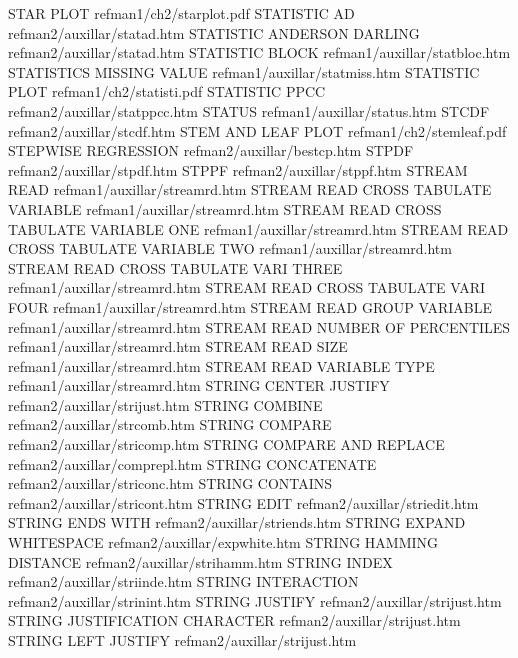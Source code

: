 STAR PLOT                               refman1/ch2/starplot.pdf
STATISTIC AD                            refman2/auxillar/statad.htm
STATISTIC ANDERSON DARLING              refman2/auxillar/statad.htm
STATISTIC BLOCK                         refman1/auxillar/statbloc.htm
STATISTICS MISSING VALUE                refman1/auxillar/statmiss.htm
STATISTIC PLOT                          refman1/ch2/statisti.pdf
STATISTIC PPCC                          refman2/auxillar/statppcc.htm
STATUS                                  refman1/auxillar/status.htm
STCDF                                   refman2/auxillar/stcdf.htm
STEM AND LEAF PLOT                      refman1/ch2/stemleaf.pdf
STEPWISE REGRESSION                     refman2/auxillar/bestcp.htm
STPDF                                   refman2/auxillar/stpdf.htm
STPPF                                   refman2/auxillar/stppf.htm
STREAM READ                             refman1/auxillar/streamrd.htm
STREAM READ CROSS TABULATE VARIABLE     refman1/auxillar/streamrd.htm
STREAM READ CROSS TABULATE VARIABLE ONE refman1/auxillar/streamrd.htm
STREAM READ CROSS TABULATE VARIABLE TWO refman1/auxillar/streamrd.htm
STREAM READ CROSS TABULATE VARI THREE   refman1/auxillar/streamrd.htm
STREAM READ CROSS TABULATE VARI FOUR    refman1/auxillar/streamrd.htm
STREAM READ GROUP VARIABLE              refman1/auxillar/streamrd.htm
STREAM READ NUMBER OF PERCENTILES       refman1/auxillar/streamrd.htm
STREAM READ SIZE                        refman1/auxillar/streamrd.htm
STREAM READ VARIABLE TYPE               refman1/auxillar/streamrd.htm
STRING CENTER JUSTIFY                   refman2/auxillar/strijust.htm
STRING COMBINE                          refman2/auxillar/strcomb.htm
STRING COMPARE                          refman2/auxillar/stricomp.htm
STRING COMPARE AND REPLACE              refman2/auxillar/comprepl.htm
STRING CONCATENATE                      refman2/auxillar/striconc.htm
STRING CONTAINS                         refman2/auxillar/stricont.htm
STRING EDIT                             refman2/auxillar/striedit.htm
STRING ENDS WITH                        refman2/auxillar/striends.htm
STRING EXPAND WHITESPACE                refman2/auxillar/expwhite.htm
STRING HAMMING DISTANCE                 refman2/auxillar/strihamm.htm
STRING INDEX                            refman2/auxillar/striinde.htm
STRING INTERACTION                      refman2/auxillar/strinint.htm
STRING JUSTIFY                          refman2/auxillar/strijust.htm
STRING JUSTIFICATION CHARACTER          refman2/auxillar/strijust.htm
STRING LEFT JUSTIFY                     refman2/auxillar/strijust.htm
